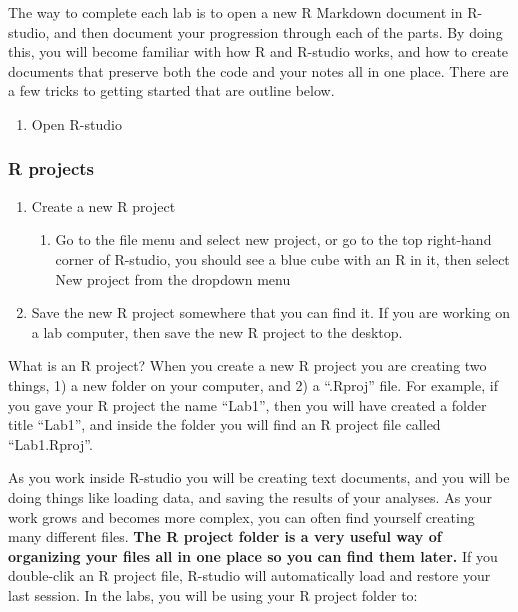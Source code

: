 \documentclass[]{book}
\providecommand{\tightlist}{%
  \setlength{\itemsep}{0pt}\setlength{\parskip}{0pt}}
\begin{document}
The way to complete each lab is to open a new R Markdown document in
R-studio, and then document your progression through each of the parts.
By doing this, you will become familiar with how R and R-studio works,
and how to create documents that preserve both the code and your notes
all in one place. There are a few tricks to getting started that are
outline below.

\begin{enumerate}
\def\labelenumi{\arabic{enumi}.}
\tightlist
\item
  Open R-studio
\end{enumerate}

\subsubsection{R projects}\label{r-projects}

\begin{enumerate}
\def\labelenumi{\arabic{enumi}.}
\setcounter{enumi}{1}
\tightlist
\item
  Create a new R project

  \begin{enumerate}
  \def\labelenumii{\alph{enumii}.}
  \tightlist
  \item
    Go to the file menu and select new project, or go to the top
    right-hand corner of R-studio, you should see a blue cube with an R
    in it, then select New project from the dropdown menu
  \end{enumerate}
\item
  Save the new R project somewhere that you can find it. If you are
  working on a lab computer, then save the new R project to the desktop.
\end{enumerate}

What is an R project? When you create a new R project you are creating
two things, 1) a new folder on your computer, and 2) a ``.Rproj'' file.
For example, if you gave your R project the name ``Lab1'', then you will
have created a folder title ``Lab1'', and inside the folder you will
find an R project file called ``Lab1.Rproj''.

As you work inside R-studio you will be creating text documents, and you
will be doing things like loading data, and saving the results of your
analyses. As your work grows and becomes more complex, you can often
find yourself creating many different files. \textbf{The R project
folder is a very useful way of organizing your files all in one place so
you can find them later.} If you double-clik an R project file, R-studio
will automatically load and restore your last session. In the labs, you
will be using your R project folder to:
\end{document}
